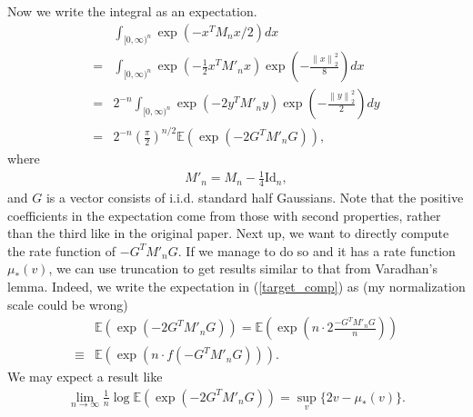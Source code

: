 \documentclass[10pt]{article}
\newcommand{\e}{\mathbb{E}}
\newcommand{\norm}[1]{\left\lVert#1\right\rVert}
\newenvironment{Proof of lemma}{\noindent{\bf Proof of Lemma}}{\hfill$\Box$\newline}
\newenvironment{Proof of claim}{\noindent{\bf Proof of claim}}{\hfill$\Box$\newline}
\newenvironment{Proof of theorem}{\noindent{\bf Proof of Theorem}}{\hfill\scriptsize{$\Box$}\newline}
\newenvironment{Proof of theorems}{\noindent{\bf Proof of Theorems}}{\hfill$\Box$\newline}
\newenvironment{Proof of proposition}{\noindent{\bf Proof of Proposition}}{\hfill$\Box$\newline}
\newenvironment{Proof of propositions}{\noindent{\bf Proof of Propositions}}{\hfill$\Box$\newline}
\newenvironment{Proof of exercise}{\noindent{\it Proof of Exercise:}}{\hfill$\Box$}
\begin{document}
Now we write the integral as an expectation.
\begin{align} \label{target_comp}
    &\int_{[0,\infty)^n} \exp \left(-x^T M_n x/2\right)dx \nonumber \\
    =&\int_{[0,\infty)^n} \exp \left(-\frac{1}{2}x^T M'_n x\right) \exp\left(-\frac{\norm{x}_2^2}{8}\right)dx \nonumber \\
    =&2^{-n}\int_{[0,\infty)^n} \exp \left(-2y^T M'_n y\right) \exp\left(-\frac{\norm{y}_2^2}{2}\right)dy \nonumber \\
    =&2^{-n}\left(\frac{\pi}{2}\right)^{n/2} \e \left( \exp \left(-2G^T M'_n G\right) \right),
\end{align}
where
\begin{align}
    M'_n = M_n - \frac{1}{4} \text{Id}_n,
\end{align}
and $G$ is a vector consists of i.i.d. standard half Gaussians. Note that the positive coefficients in the expectation come from those with second properties, rather than the third like in the original paper. Next up, we want to directly compute the rate function of $-G^T M'_n G$. If we manage to do so and it has a rate function $\mu_*(v)$, we can use truncation to get results similar to that from Varadhan's lemma. Indeed, we write the expectation in (\ref{target_comp}) as (my normalization scale could be wrong)
\begin{align}
    &\e \left( \exp \left(-2G^T M'_n G\right) \right) = \e \left( \exp \left(n \cdot 2\frac{-G^T M'_n G}{n}\right) \right) \nonumber \\
    \equiv& \e \left( \exp \left(n \cdot f(-G^T M'_n G)\right) \right).
\end{align}
We may expect a result like
\begin{align}
    \lim_{n \to \infty} \frac{1}{n} \log \e \left( \exp \left(-2G^T M'_n G\right) \right) = \sup_{v}\{2v - \mu_*(v)\}.
\end{align}
\end{document}
